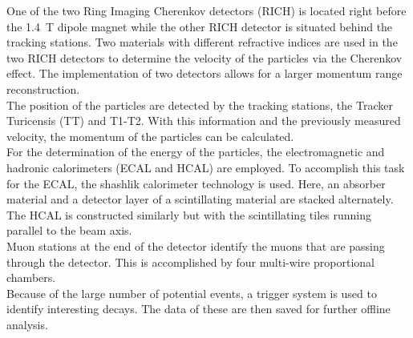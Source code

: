 One of the two Ring Imaging Cherenkov detectors (RICH) is located right before the \qty{1.4}{\tesla} dipole magnet while the other RICH detector is situated behind the tracking stations. Two materials with 
different refractive indices are used in the two RICH detectors to determine the velocity of the particles via the Cherenkov effect. The implementation of two detectors allows for a larger momentum range 
reconstruction. \\
The position of the particles are detected by the tracking stations, the Tracker Turicensis (TT) and T1-T2. With this information and the previously measured velocity, the momentum of the particles can
be calculated. \\
For the determination of the energy of the particles, the electromagnetic and hadronic calorimeters (ECAL and HCAL) are employed. To accomplish this task for the ECAL, the shashlik calorimeter 
technology is used. Here, an absorber material and a detector layer of a scintillating material are stacked alternately. The HCAL is constructed similarly but with the scintillating tiles running 
parallel to the beam axis. \\
Muon stations at the end of the detector identify the muons that are passing through the detector. This is accomplished by four multi-wire proportional chambers. \\
Because of the large number of potential events, a trigger system is used to identify interesting decays. The data of these are then saved for further offline analysis.

